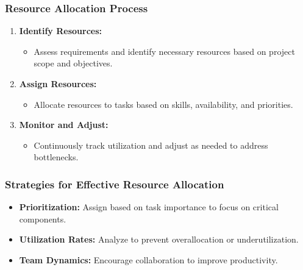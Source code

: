 \documentclass[aspectratio=169]{beamer}
\begin{document}
\begin{frame}[fragile]
    \frametitle{Resource Allocation Process}
    \begin{enumerate}
        \item \textbf{Identify Resources:} 
            \begin{itemize}
                \item Assess requirements and identify necessary resources based on project scope and objectives.
            \end{itemize}
            
        \item \textbf{Assign Resources:} 
            \begin{itemize}
                \item Allocate resources to tasks based on skills, availability, and priorities.
            \end{itemize}
        
        \item \textbf{Monitor and Adjust:}
            \begin{itemize}
                \item Continuously track utilization and adjust as needed to address bottlenecks.
            \end{itemize}
    \end{enumerate}
\end{frame}

\begin{frame}[fragile]
    \frametitle{Strategies for Effective Resource Allocation}
    \begin{itemize}
        \item \textbf{Prioritization:} Assign based on task importance to focus on critical components.
        \item \textbf{Utilization Rates:} Analyze to prevent overallocation or underutilization.
        \item \textbf{Team Dynamics:} Encourage collaboration to improve productivity.
    \end{itemize}
\end{frame}
\end{document}
